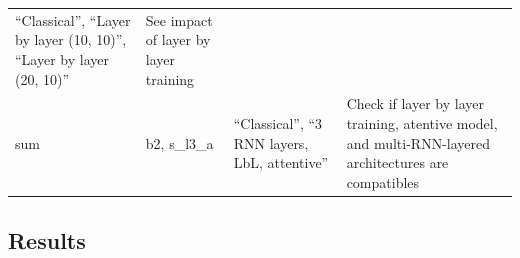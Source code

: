 \begin{longtable}[]{@{}llll@{}}
\begin{minipage}[t]{0.30\columnwidth}
``Classical'', ``Layer by layer (10, 10)'', ``Layer by layer (20,
10)''\strut
\end{minipage} & \begin{minipage}[t]{0.46\columnwidth}\raggedright\strut
See impact of layer by layer training\strut
\end{minipage}\tabularnewline
\begin{minipage}[t]{0.04\columnwidth}\raggedright\strut
sum\strut
\end{minipage} & \begin{minipage}[t]{0.08\columnwidth}\raggedright\strut
b2, s\_l3\_a\strut
\end{minipage} & \begin{minipage}[t]{0.30\columnwidth}\raggedright\strut
``Classical'', ``3 RNN layers, LbL, attentive''\strut
\end{minipage} & \begin{minipage}[t]{0.46\columnwidth}\raggedright\strut
Check if layer by layer training, atentive model, and multi-RNN-layered
architectures are compatibles\strut
\end{minipage}\tabularnewline
\hline
\end{longtable}

\pagebreak
\subsection{Results}

